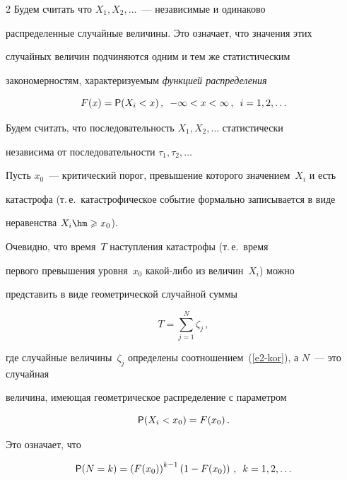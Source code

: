 \begin{multicols}{2}
Будем считать что $X_1,X_2,\ldots$~--- независимые и одинаково


распределенные случайные величины. Это означает, что значения этих


случайных величин подчиняются одним и тем же статистическим


закономерностям, характеризуемым \textit{функцией распределения}


$$


F(x)={\sf P}(X_i<x)\,,\enskip -\infty<x<\infty\,,\enskip i=1,2,\ldots


$$


Будем считать, что последовательность $X_1,X_2,\ldots$ статистически


независима от последовательности $\tau_1,\tau_2,\ldots$





Пусть $x_0$~--- критический порог, превышение которого значением~$X_i$ и есть 


катастрофа (т.\,е.\ катастрофическое событие формально записывается в виде 


неравенства $X_i\hm\geqslant x_0$).





Очевидно, что время~$T$ наступления катастрофы (т.\,е.\ время


первого превышения уровня~$x_0$ ка\-кой-ли\-бо из величин~$X_i$) можно


представить в виде геометрической случайной суммы


\begin{equation}


T=\sum\limits_{j=1}^{N}\zeta_j\,,\label{e3-kor}


\end{equation} 


где случайные величины~$\zeta_j$ определены соотношением~(\ref{e2-kor}), а $N$~--- это случайная


величина, имеющая геометрическое распределение с параметром 


$$


{\sf P}(X_i<x_0)=F(x_0)\,.


$$ 


Это означает, что


$$


{\sf P}(N=k)=\left(F(x_0)\right)^{k-1}\left(1-F(x_0)\right)\,,\enskip


k=1,2,\ldots


$$



\end{multicols}
